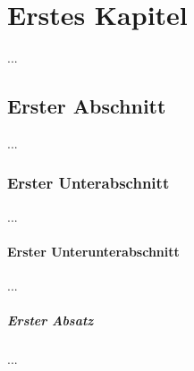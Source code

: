 \documentclass[12pt,a4paper]{scrbook}
\begin{document}
\tableofcontents
\chapter{Erstes Kapitel}
...
\section{Erster Abschnitt}
...
\subsection{Erster Unterabschnitt}
...
\subsubsection{Erster Unterunterabschnitt}
...
\paragraph{Erster Absatz}
...
\end{document}

